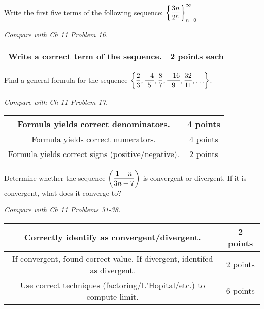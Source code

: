 \documentclass[12pt]{exam}
\newcommand{\ds}{\ensuremath{\displaystyle}}
\begin{document}
\begin{questions}

\setcounter{question}{0}
\question[10]
Write the first five terms of the following sequence:
$\ds\left\{\frac{3n}{2^n}\right\}_{n=0}^\infty$

\textit{Compare with Ch 11 Problem 16.}

\begin{center}
  \begin{tabular}{|c|c|}
    \hline
    Write a correct term of the sequence. & 2 points each \\
    \hline
  \end{tabular}
\end{center}

\vfill

\newpage

\question[10]
Find a general formula for the sequence
$
\ds \left\{
\frac{2}{3},
\frac{-4}{5},
\frac{8}{7},
\frac{-16}{9},
\frac{32}{11},
\ldots \right\}
$.

\textit{Compare with Ch 11 Problem 17.}

\begin{center}
  \begin{tabular}{|c|c|}
    \hline
    Formula yields correct denominators. & 4 points \\
    \hline
    Formula yields correct numerators. & 4 points \\
    \hline
    Formula yields correct signs (positive/negative). & 2 points \\
    \hline
  \end{tabular}
\end{center}

\vfill

\newpage

\question[10]
Determine whether the sequence $\ds \left( \frac{1-n}{3n+7} \right)$
is convergent or divergent.  If it is convergent, what does it converge to?

\textit{Compare with Ch 11 Problems 31-38.}

\begin{center}
  \begin{tabular}{|c|c|}
    \hline
    Correctly identify as convergent/divergent. & 2 points \\
    \hline
    If convergent, found correct value.
    If divergent, identifed as divergent. & 2 points \\
    \hline
    Use correct techniques (factoring/L'Hopital/etc.) to compute
    limit. & 6 points \\
    \hline
  \end{tabular}
\end{center}


\end{questions}
\end{document}
